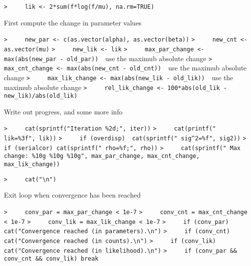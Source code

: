 \documentclass[a4paper]{article}
\begin{document}
\verb~>     lik <- 2*sum(f*log(f/mu), na.rm=TRUE)~\par

First compute the change in parameter values\par
\verb~>     new_par <- c(as.vector(alpha), as.vector(beta))~\newline
\verb~>     new_cnt <- as.vector(mu)~\newline
\verb~>     new_lik <- lik~\newline
\verb~>     max_par_change <- max(abs(new_par - old_par))  ~{\sffamily use the maximub absolute change}\newline
\verb~>     max_cnt_change <- max(abs(new_cnt - old_cnt))  ~{\sffamily use the maximub absolute change}\newline
\verb~>     max_lik_change <- max(abs(new_lik - old_lik))  ~{\sffamily use the maximub absolute change}\newline
\verb~>     rel_lik_change <- 100*abs(old_lik - new_lik)/abs(old_lik)~\par

Write out progress, and some more info\par
\verb~>     cat(sprintf("Iteration %2d;", iter))~\newline
\verb~>     cat(printf(" lik=%3f", lik))~\newline
\verb~>     if (overdisp)  cat(sprintf(" sig^2=%f", sig2))~\newline
\verb~>     if (serialcor) cat(sprintf(" rho=%f;", rho))~\newline
\verb~>     cat(sprintf(" Max change: %10g %10g %10g", max_par_change, max_cnt_change, max_lik_change))~\par

\verb~>     cat("\n")~\par

Exit loop when convergence has been reached\par
\verb~>     conv_par = max_par_change < 1e-7~\newline
\verb~>     conv_cnt = max_cnt_change < 1e-7~\newline
\verb~>     conv_lik = max_lik_change < 1e-7~\newline
\verb~>     if (conv_par) cat("Convergence reached (in parameters).\n")~\newline
\verb~>     if (conv_cnt) cat("Convergence reached (in counts).\n")~\newline
\verb~>     if (conv_lik) cat("Convergence reached (in likelihood).\n")~\newline
\verb~>     if (conv_par && conv_cnt && conv_lik) break~\par
\end{document}
